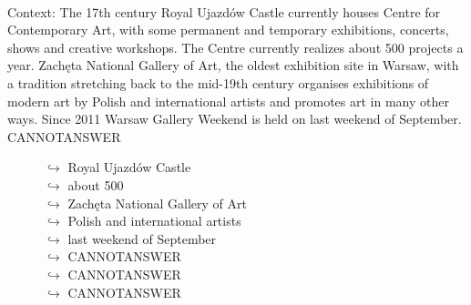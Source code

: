 \documentclass[11pt,a4paper, onecolumn]{article}
\begin{document}
\\ Context: The 17th century Royal Ujazdów Castle currently houses Centre for Contemporary Art, with some permanent and temporary exhibitions, concerts, shows and creative workshops. The Centre currently realizes about 500 projects a year. Zachęta National Gallery of Art, the oldest exhibition site in Warsaw, with a tradition stretching back to the mid-19th century organises exhibitions of modern art by Polish and international artists and promotes art in many other ways. Since 2011 Warsaw Gallery Weekend is held on last weekend of September. CANNOTANSWER

\begin{figure}[t] \small \begin{tcolorbox}[boxsep=0pt,left=5pt,right=0pt,top=2pt,colback = yellow!5] \begin{dialogue}
 \small 
\colorbox{pink!25}{$\hookrightarrow$}
{ Royal Ujazdów Castle }
\\
\colorbox{pink!25}{$\hookrightarrow$}
{ about 500 }
\\
\colorbox{pink!25}{$\hookrightarrow$}
{ Zachęta National Gallery of Art }
\\
\colorbox{pink!25}{$\hookrightarrow$}
{ Polish and international artists }
\\
\colorbox{pink!25}{$\hookrightarrow$}
{ last weekend of September }
\\
\colorbox{pink!25}{$\hookrightarrow$}
{ CANNOTANSWER }
\\
\colorbox{pink!25}{$\hookrightarrow$}
{ CANNOTANSWER }
\\
\colorbox{pink!25}{$\hookrightarrow$}
{ CANNOTANSWER }
 \end{dialogue}\end{tcolorbox}\end{figure}\begin{figure}[t] \small \begin{tcolorbox}[boxsep=0pt,left=5pt,right=0pt,top=2pt,colback = yellow!5] \begin{dialogue}

\end{dialogue}
\end{tcolorbox}
\end{figure}
\end{document}
